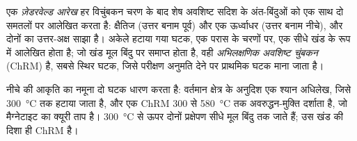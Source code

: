 \begin{definition}\label{def:b3:palaeomagnetism:zijderveld}
एक \emph{ज़ेडरवेल्ड आरेख} हर विचुंबकन चरण के बाद शेष अवशिष्ट सदिश के
अंत-बिंदुओं को एक साथ दो समतलों पर आलेखित करता है: क्षैतिज (उत्तर बनाम पूर्व) और एक ऊर्ध्वाधर
(उत्तर बनाम नीचे), और दोनों का उत्तर-अक्ष साझा है।
अकेले हटाया गया घटक, एक परास के चरणों पर, एक सीधे खंड के रूप में आलेखित होता है;
जो खंड मूल बिंदु पर समाप्त होता है, वही
\emph{अभिलक्षणिक अवशिष्ट चुंबकन}
(ChRM) है, सबसे स्थिर घटक, जिसे परीक्षण अनुमति देने पर प्राथमिक
घटक माना जाता है।
\end{definition}

नीचे की आकृति का नमूना दो घटक धारण करता है: वर्तमान क्षेत्र के अनुदिश एक श्यान अधिलेख,
जिसे \qty{300}{\celsius} तक हटाया जाता है, और एक ChRM 300 से
\qty{580}{\celsius} तक अवरुद्धन-मुक्ति दर्शाता है, जो मैग्नेटाइट का क्यूरी ताप है।
\qty{300}{\celsius} से ऊपर दोनों प्रक्षेपण सीधे मूल बिंदु तक जाते हैं; उस खंड की
दिशा ही ChRM है।


